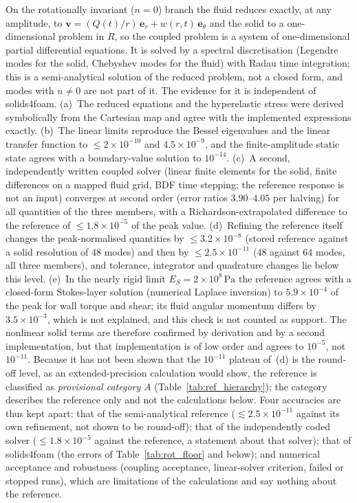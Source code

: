 On the rotationally invariant ($n=0$) branch the fluid reduces exactly, at any amplitude, to $\mathbf{v}=(Q(t)/r)\,\mathbf{e}_r+w(r,t)\,\mathbf{e}_\theta$ and the solid to a one-dimensional problem in $R$, so the coupled problem is a system of one-dimensional partial differential equations.
It is solved by a spectral discretisation (Legendre modes for the solid, Chebyshev modes for the fluid) with Radau time integration; this is a semi-analytical solution of the reduced problem, not a closed form, and modes with $n\neq0$ are not part of it.
The evidence for it is independent of solids4foam.
(a)~The reduced equations and the hyperelastic stress were derived symbolically from the Cartesian map and agree with the implemented expressions exactly.
(b)~The linear limits reproduce the Bessel eigenvalues and the linear transfer function to $\le2\times10^{-10}$ and $4.5\times10^{-9}$, and the finite-amplitude static state agrees with a boundary-value solution to $10^{-14}$.
(c)~A second, independently written coupled solver (linear finite elements for the solid, finite differences on a mapped fluid grid, BDF time stepping; the reference response is not an input) converges at second order (error ratios $3.90$--$4.05$ per halving) for all quantities of the three members, with a Richardson-extrapolated difference to the reference of $\le1.8\times10^{-5}$ of the peak value.
(d)~Refining the reference itself changes the peak-normalised quantities by $\le3.2\times10^{-8}$ (stored reference against a solid resolution of 48 modes) and then by $\le2.5\times10^{-11}$ (48 against 64 modes, all three members), and tolerance, integrator and quadrature changes lie below this level.
(e)~In the nearly rigid limit $E_S=2\times10^{8}\,\mathrm{Pa}$ the reference agrees with a closed-form Stokes-layer solution (numerical Laplace inversion) to $5.9\times10^{-4}$ of the peak for wall torque and shear; its fluid angular momentum differs by $3.5\times10^{-3}$, which is not explained, and this check is not counted as support.
The nonlinear solid terms are therefore confirmed by derivation and by a second implementation, but that implementation is of low order and agrees to $10^{-5}$, not $10^{-11}$.
Because it has not been shown that the $10^{-11}$ plateau of~(d) is the round-off level, as an extended-precision calculation would show, the reference is classified as \emph{provisional category A} (Table~\ref{tab:ref_hierarchy}); the category describes the reference only and not the calculations below.
Four accuracies are thus kept apart: that of the semi-analytical reference ($\lesssim2.5\times10^{-11}$ against its own refinement, not shown to be round-off); that of the independently coded solver ($\le1.8\times10^{-5}$ against the reference, a statement about that solver); that of solids4foam (the errors of Table~\ref{tab:rot_floor} and below); and numerical acceptance and robustness (coupling acceptance, linear-solver criterion, failed or stopped runs), which are limitations of the calculations and say nothing about the reference.


